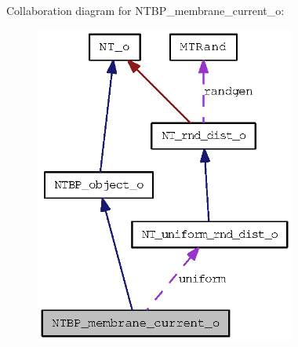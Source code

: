 Collaboration diagram for NTBP\_\-membrane\_\-current\_\-o:
\nopagebreak
\begin{figure}[H]
\begin{center}
\leavevmode
\includegraphics[width=243pt]{class_n_t_b_p__membrane__current__o__coll__graph}
\end{center}
\end{figure}
